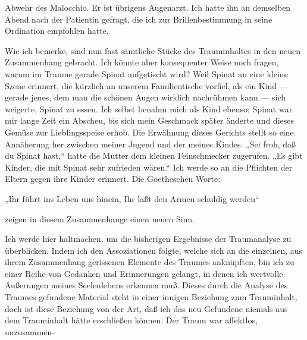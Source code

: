 \documentclass{article}
\begin{document}
         
            
            
            
        \pstart
        Abwehr des Malocchio. Er ist übrigens Augenarzt.
               Ich hatte ihn an demselben Abend nach der Patientin gefragt, die ich zur
                  Brillenbestimmung in seine Ordination
               empfohlen hatte.
        \pend
    
            
        \pstart
        Wie ich bemerke, sind nun fast sämtliche Stücke des Trauminhaltes in
               den neuen Zusammenhang gebracht. Ich könnte aber konsequenter Weise noch fragen,
               warum im Traume gerade Spinat aufgetischt wird? Weil Spinat an eine kleine Szene erinnert, die kürzlich an unserem
               Familientische vorfiel, als ein Kind — gerade jenes, dem man die schönen Augen wirklich nachrühmen kann
               — sich weigerte, Spinat zu essen. Ich selbst benahm mich als Kind ebenso; Spinat war mir lange Zeit ein Abscheu, bis sich
               mein Geschmack später änderte und dieses Gemüse zur Lieblingsspeise erhob. Die
               Erwähnung dieses Gerichts stellt so eine Annäherung her zwischen meiner Jugend
               und der meines Kindes. „Sei froh, daß du Spinat hast,“ hatte die Mutter dem
               kleinen Feinschmecker zugerufen. „Es gibt Kinder, die mit Spinat sehr zufrieden
               wären.“ Ich werde so an die Pflichten der Eltern gegen ihre Kinder erinnert. Die
               Goetheschen Worte:
        \pend
    
            
        \pstart
        „Ihr führt ins Leben uns hinein, Ihr laßt den Armen schuldig werden“
        \pend
    
            
            
        \pstart
        zeigen in diesem Zusammenhange einen neuen Sinn.
        \pend
    
            
        \pstart
        Ich werde hier haltmachen, um die bisherigen Ergebnisse der Traumanalyse zu
               überblicken. Indem ich den Assoziationen folgte, welche sich an die einzelnen,
               aus ihrem Zusammenhang gerissenen Elemente des Traumes anknüpften, bin ich zu
               einer Reihe von Gedanken und Erinnerungen gelangt, in denen ich wertvolle
               Äußerungen meines Seelenlebens erkennen muß. Dieses durch die Analyse des
               Traumes gefundene Material steht in einer innigen Beziehung zum Trauminhalt,
               doch ist diese Beziehung von der Art, daß ich das neu Gefundene niemals aus dem
               Trauminhalt hätte erschließen können. Der Traum war affektlos, unzusammen-
        \pend
    
\end{document}
